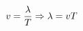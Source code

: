 \documentclass[preview]{standalone}
\begin{document}
\begin{align*}
\special{dvisvgm:raw <g id='unique000'>}v = \frac{\lambda}{T} \Rightarrow \lambda = vT\special{dvisvgm:raw </g>}
\end{align*}
\end{document}
